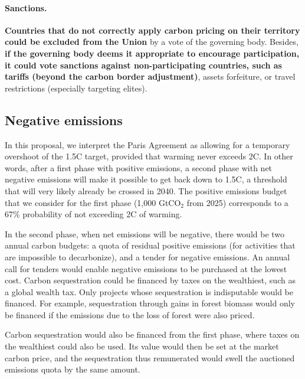 \documentclass[12pt,english]{article}
\begin{document}
\paragraph{Sanctions.}

\textbf{Countries that do not correctly apply carbon pricing on their territory could be excluded from the Union} by a vote of the governing body. 
Besides, \textbf{if the governing body deems it appropriate to encourage participation, it could vote sanctions against non-participating countries, such as tariffs (beyond the carbon border adjustment)}, assets forfeiture, or travel restrictions (especially targeting elites). 

\subsection{Negative emissions\label{subsec:negative_emissions}}

In this proposal, we interpret the Paris Agreement as allowing for a temporary overshoot of the 1.5\textdegree{}C target, provided that warming never exceeds 2\textdegree{}C. In other words, after a first phase with positive emissions, a second phase with net negative emissions will make it possible to get back down to 1.5\textdegree{}C, a threshold that will very likely already be crossed in 2040.\citep{diffenbaugh_data-driven_2023} 
The positive emissions budget that we consider for the first phase (1,000 GtCO$_\text{2}$ from 2025) corresponds to a 67\% probability of not exceeding 2\textdegree{}C of warming. 

In the second phase, when net emissions will be negative, there would be two annual carbon budgets: a quota of residual positive emissions (for activities that are impossible to decarbonize), and a tender for negative emissions. An annual call for tenders would enable negative emissions to be purchased at the lowest cost. Carbon sequestration could be financed by taxes on the wealthiest, such as a global wealth tax. Only projects whose sequestration is indisputable would be financed. For example, sequestration through gains in forest biomass would only be financed if the emissions due to the loss of forest were also priced. 

Carbon sequestration would also be financed from the first phase, where taxes on the wealthiest could also be used. Its value would then be set at the market carbon price, and the sequestration thus remunerated would swell the auctioned emissions quota by the same amount.\citep{edenhofer_governance_2023} 
\end{document}
